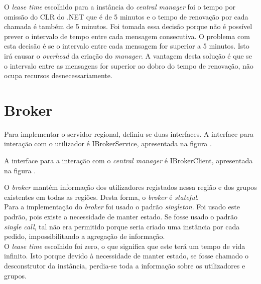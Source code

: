 O \textit{lease time} escolhido para a instância do \textit{central manager} foi o tempo por omissão do CLR do .NET que é de 5 minutos e o tempo de renovação por cada chamada é também de 5 minutos. Foi tomada essa decisão porque não é possível prever o intervalo de tempo entre cada mensagem consecutiva. O problema com esta decisão é se o intervalo entre cada mensagem for superior a 5 minutos. Isto irá causar o \textit{overhead} da criação do \textit{manager}. A vantagem desta solução é que se o intervalo entre as mensagens for superior ao dobro do tempo de renovação, não ocupa recursos desnecessariamente.

\section{Broker} \label{broker}

Para implementar o servidor regional, definiu-se duas interfaces. A interface para interação com o utilizador é IBrokerService, apresentada na figura \label{ibrokerservice}. 


A interface para a interação com o \textit{central manager} é IBrokerClient, apresentada na figura \label{ibrokerclient}.


O \textit{broker} mantém informação dos utilizadores registados nessa região e dos grupos existentes em todas as regiões. Desta forma, o \textit{broker} é \textit{stateful}.\\

Para a implementação do \textit{broker} foi usado o padrão \textit{singleton}. Foi usado este padrão, pois existe a necessidade de manter estado. Se fosse usado o padrão \textit{single call}, tal não era permitido porque seria criado uma instância por cada pedido, impossibilitando a agregação de informação.\\

O \textit{lease time} escolhido foi zero, o que significa que este terá um tempo de vida infinito. Isto porque devido à necessidade de manter estado, se fosse chamado o desconstrutor da instância, perdia-se toda a informação sobre os utilizadores e grupos.
